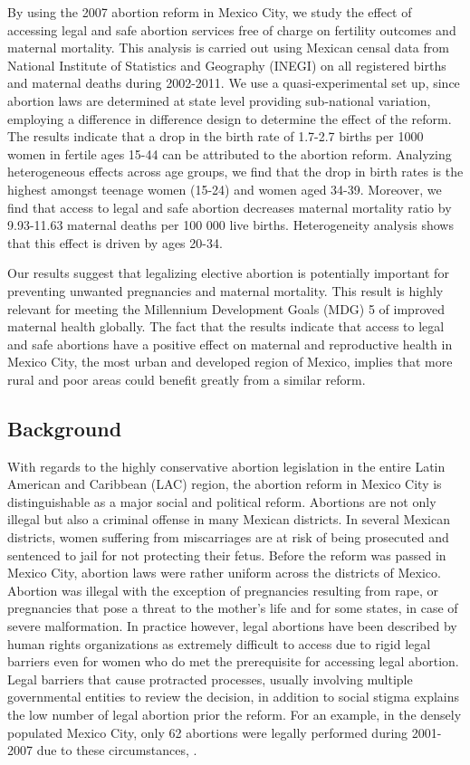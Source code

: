 \documentclass[a4paper, 11pt]{article}
\begin{document}
\begin{spacing}{1.5}
\begin{multicols}{2}
 By using the 2007 abortion reform in Mexico City, we study the effect of accessing legal and safe abortion services free of charge on fertility outcomes and maternal mortality. This analysis is carried out using Mexican censal data from National Institute of Statistics and Geography (INEGI) on all registered births and maternal deaths during 2002-2011. We use a quasi-experimental set up, since abortion laws are determined at state level providing sub-national variation, employing a difference in difference design to determine the effect of the reform. The results indicate that a drop in the birth rate of 1.7-2.7 births per 1000 women in fertile ages 15-44 can be attributed to the abortion reform. Analyzing heterogeneous effects across age groups, we find that the drop in birth rates is the highest amongst teenage women (15-24) and women aged 34-39. Moreover, we find that access to legal and safe abortion decreases maternal mortality ratio by 9.93-11.63 maternal deaths per 100 000 live births. Heterogeneity analysis shows that this effect is driven by ages 20-34. 
 
 Our results suggest that legalizing elective abortion is potentially important for preventing unwanted pregnancies and maternal mortality. This result is highly relevant for meeting the Millennium Development Goals (MDG) 5 of improved maternal health globally. The fact that the results indicate that access to legal and safe abortions have a positive effect on maternal and reproductive health in Mexico City, the most urban and developed region of Mexico, implies that more rural and poor areas could benefit greatly from a similar reform.        
 \subsection{Background}
 With regards to the highly conservative abortion legislation in the entire Latin American and Caribbean (LAC) region, the abortion reform in Mexico City is distinguishable as a major social and political reform. Abortions are not only illegal but also a criminal offense in many Mexican districts. In several Mexican districts, women suffering from miscarriages are at risk of being prosecuted and sentenced to jail for not protecting their fetus. Before the reform was passed in Mexico City, abortion laws were rather uniform across the districts of Mexico.  Abortion was illegal with the exception of pregnancies resulting from rape, or pregnancies that pose a threat to the mother's life and for some states, in case of severe malformation. In practice however, legal abortions have been described by human rights organizations as extremely difficult to access due to rigid legal barriers even for women who do met the prerequisite for accessing legal abortion. Legal barriers that cause protracted processes, usually involving multiple governmental entities to review the decision, in addition to social stigma explains the low number of legal abortion prior the reform. For an example, in the densely populated Mexico City, only 62 abortions were legally performed during 2001-2007 due to these circumstances,  \cite{Becker}. 
 

\end{multicols}
\end{spacing}
\end{document}
